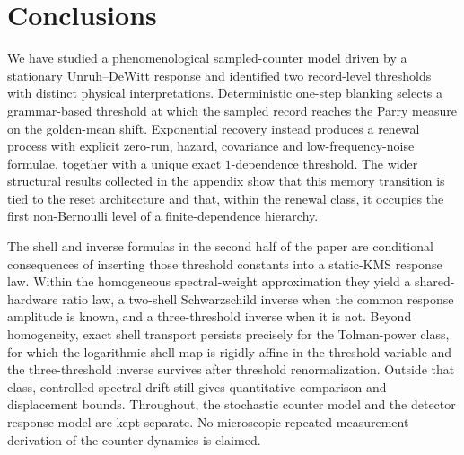 \documentclass[11pt]{article}
\theoremstyle{definition}
\begin{document}
\section{Conclusions}\label{sec:discussion}

We have studied a phenomenological sampled-counter model driven by a stationary Unruh--DeWitt response and identified two record-level thresholds with distinct physical interpretations. Deterministic one-step blanking selects a grammar-based threshold at which the sampled record reaches the Parry measure on the golden-mean shift. Exponential recovery instead produces a renewal process with explicit zero-run, hazard, covariance and low-frequency-noise formulae, together with a unique exact $1$-dependence threshold. The wider structural results collected in the appendix show that this memory transition is tied to the reset architecture and that, within the renewal class, it occupies the first non-Bernoulli level of a finite-dependence hierarchy.

The shell and inverse formulas in the second half of the paper are conditional consequences of inserting those threshold constants into a static-KMS response law. Within the homogeneous spectral-weight approximation they yield a shared-hardware ratio law, a two-shell Schwarzschild inverse when the common response amplitude is known, and a three-threshold inverse when it is not. Beyond homogeneity, exact shell transport persists precisely for the Tolman-power class, for which the logarithmic shell map is rigidly affine in the threshold variable and the three-threshold inverse survives after threshold renormalization. Outside that class, controlled spectral drift still gives quantitative comparison and displacement bounds. Throughout, the stochastic counter model and the detector response model are kept separate. No microscopic repeated-measurement derivation of the counter dynamics is claimed.

\appendix



\end{document}
